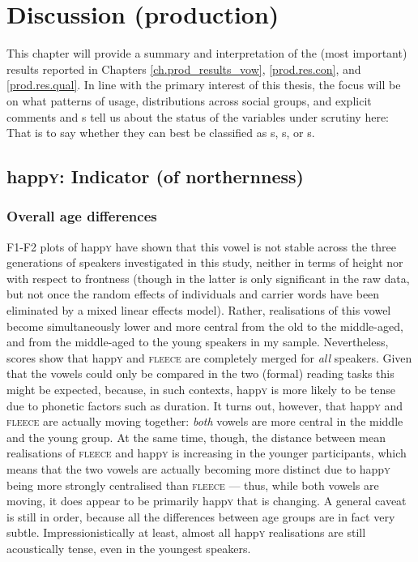 \chapter{Discussion (production)}
\label{ch.prod_discussion}

This chapter will provide a summary and interpretation of the (most important) results reported in Chapters \ref{ch.prod_results_vow}, \ref{prod.res.con}, and \ref{prod.res.qual}.
In line with the primary interest of this thesis, the focus will be on what patterns of usage, distributions across social groups, and explicit comments and s tell us about the status of the variables under scrutiny here: That is to say whether they can best be classified as s, s, or s.

\section{happ\textsc{y}: Indicator (of northernness)}
\label{prod.disc.happy}

\subsection{Overall age differences}
\label{prod.disc.happy.age}

F1-F2 plots of happ\textsc{y} have shown that this vowel is not stable across the three generations of speakers investigated in this study, neither in terms of height nor with respect to frontness (though  in the latter is only significant in the raw data, but not once the random effects of individuals and carrier words have been eliminated by a mixed linear effects model).
Rather, realisations of this vowel become simultaneously lower and more central from the old to the middle-aged, and from the middle-aged to the young speakers in my sample.
Nevertheless,  scores show that happ\textsc{y} and \textsc{fleece} are completely merged for \emph{all} speakers.
Given that the vowels could only be compared in the two (formal) reading tasks this might be expected, because, in such contexts, happ\textsc{y} is more likely to be tense due to phonetic factors such as duration.
It turns out, however, that happ\textsc{y} and \textsc{fleece} are actually moving together: \emph{both} vowels are more central in the middle and the young group.
At the same time, though, the distance between mean realisations of \textsc{fleece} and happ\textsc{y} is increasing in the younger participants, which means that the two vowels are actually becoming more distinct due to happ\textsc{y} being more strongly centralised than \textsc{fleece} --- thus, while both vowels are moving, it does appear to be primarily happ\textsc{y} that is changing.
A general caveat is still in order, because all the differences between age groups are in fact very subtle.
Impressionistically at least, almost all happ\textsc{y} realisations are still acoustically tense, even in the youngest speakers.

